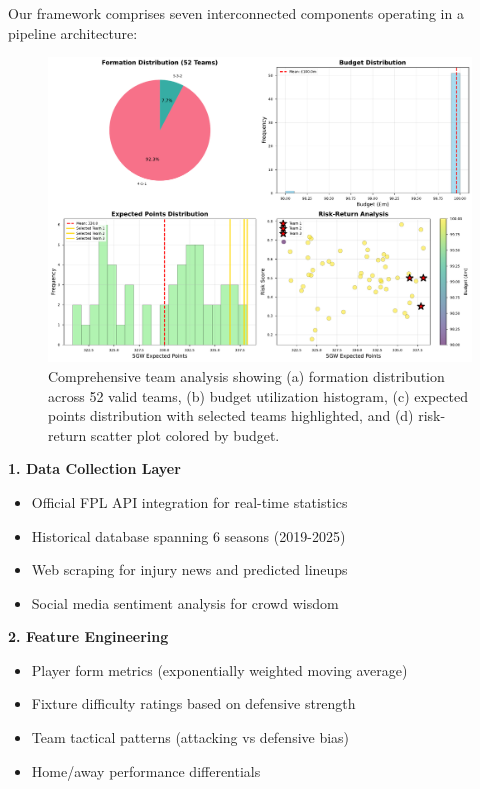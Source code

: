\documentclass[10pt,a4paper,twocolumn]{article}
\begin{document}
Our framework comprises seven interconnected components operating in a pipeline architecture:

\begin{figure}[t]
\centering
\includegraphics[width=\textwidth]{figures/team_composition_analysis.pdf}
\caption{Comprehensive team analysis showing (a) formation distribution across 52 valid teams, (b) budget utilization histogram, (c) expected points distribution with selected teams highlighted, and (d) risk-return scatter plot colored by budget.}
\label{fig:team_composition}
\end{figure}

\textbf{1. Data Collection Layer}
\begin{itemize}
\item Official FPL API integration for real-time statistics
\item Historical database spanning 6 seasons (2019-2025)
\item Web scraping for injury news and predicted lineups
\item Social media sentiment analysis for crowd wisdom
\end{itemize}

\textbf{2. Feature Engineering}
\begin{itemize}
\item Player form metrics (exponentially weighted moving average)
\item Fixture difficulty ratings based on defensive strength
\item Team tactical patterns (attacking vs defensive bias)
\item Home/away performance differentials
\end{itemize}
\end{document}
